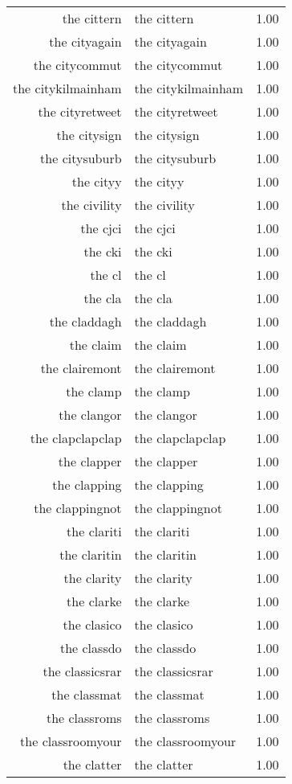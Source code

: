 \begin{table}[ht]
\begin{tabular}{rlr}
  the cittern & the cittern & 1.00 \\ 
  the cityagain & the cityagain & 1.00 \\ 
  the citycommut & the citycommut & 1.00 \\ 
  the citykilmainham & the citykilmainham & 1.00 \\ 
  the cityretweet & the cityretweet & 1.00 \\ 
  the citysign & the citysign & 1.00 \\ 
  the citysuburb & the citysuburb & 1.00 \\ 
  the cityy & the cityy & 1.00 \\ 
  the civility & the civility & 1.00 \\ 
  the cjci & the cjci & 1.00 \\ 
  the cki & the cki & 1.00 \\ 
  the cl & the cl & 1.00 \\ 
  the cla & the cla & 1.00 \\ 
  the claddagh & the claddagh & 1.00 \\ 
  the claim & the claim & 1.00 \\ 
  the clairemont & the clairemont & 1.00 \\ 
  the clamp & the clamp & 1.00 \\ 
  the clangor & the clangor & 1.00 \\ 
  the clapclapclap & the clapclapclap & 1.00 \\ 
  the clapper & the clapper & 1.00 \\ 
  the clapping & the clapping & 1.00 \\ 
  the clappingnot & the clappingnot & 1.00 \\ 
  the clariti & the clariti & 1.00 \\ 
  the claritin & the claritin & 1.00 \\ 
  the clarity & the clarity & 1.00 \\ 
  the clarke & the clarke & 1.00 \\ 
  the clasico & the clasico & 1.00 \\ 
  the classdo & the classdo & 1.00 \\ 
  the classicsrar & the classicsrar & 1.00 \\ 
  the classmat & the classmat & 1.00 \\ 
  the classroms & the classroms & 1.00 \\ 
  the classroomyour & the classroomyour & 1.00 \\ 
  the clatter & the clatter & 1.00 \\ 

\end{tabular}
\end{table}

